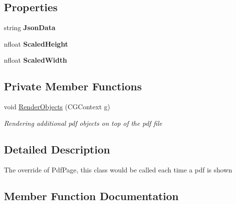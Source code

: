 \subsection*{Properties}
\begin{DoxyCompactItemize}
\item 
\mbox{\label{class_ramboell_1_1i_o_s_1_1_marked_pdf_page_a3af85265b74d683b572e30af610b7501}} 
string {\bfseries Json\+Data}
\item 
\mbox{\label{class_ramboell_1_1i_o_s_1_1_marked_pdf_page_a67d8c4b594f553ef60a95485825470da}} 
nfloat {\bfseries Scaled\+Height}
\item 
\mbox{\label{class_ramboell_1_1i_o_s_1_1_marked_pdf_page_a52884963a5725af7aae3a37b7cd44d0a}} 
nfloat {\bfseries Scaled\+Width}
\end{DoxyCompactItemize}
\subsection*{Private Member Functions}
\begin{DoxyCompactItemize}
\item 
void \hyperlink{class_ramboell_1_1i_o_s_1_1_marked_pdf_page_a2e1ffa38d0136d9cf7d353797165b2fb}{Render\+Objects} (C\+G\+Context g)
\begin{DoxyCompactList}\small\item\em Rendering additional pdf objects on top of the pdf file \end{DoxyCompactList}\end{DoxyCompactItemize}


\subsection{Detailed Description}
The override of Pdf\+Page, this class would be called each time a pdf is shown 



\subsection{Member Function Documentation}
\mbox{\label{class_ramboell_1_1i_o_s_1_1_marked_pdf_page_a65755814023826ac65bbeb51de0a57df}} 
